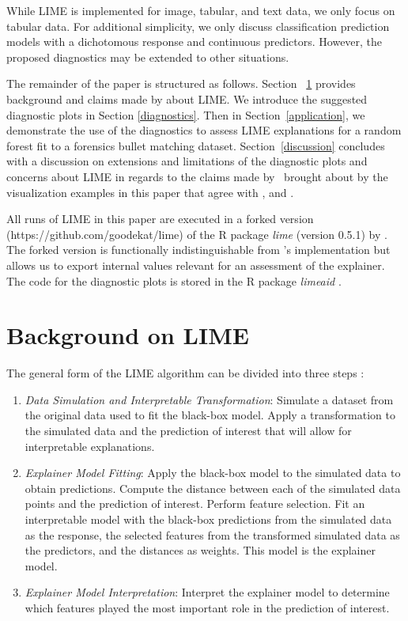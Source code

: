 \documentclass[AMS,STIX2COL]{WileyNJD-v2}\usepackage[]{graphicx}\usepackage[]{color}
\begin{document}
While LIME is implemented for image, tabular, and text data, we only focus on tabular data. For additional simplicity, we only discuss classification prediction models with a dichotomous response  and continuous predictors. However, the proposed diagnostics may be extended to other situations.

The remainder of the paper is structured as follows. Section ~\ref{background} provides background and claims made by \citet{ribeiro:2016} about LIME. We introduce the suggested diagnostic plots in Section \ref{diagnostics}. Then in Section~\ref{application}, we demonstrate the use of the diagnostics to assess LIME explanations for a random forest fit to a forensics bullet matching dataset. Section~\ref{discussion} concludes with a discussion on extensions and limitations of the diagnostic plots and concerns about LIME in regards to the claims made by~\citet{ribeiro:2016} brought about by the visualization examples in this paper that agree with \citet{alvarezmelis:2018, laugel:2018}, and \citet{molnar:2019}.

All runs of LIME in this paper are executed in a forked version (https://github.com/goodekat/lime) of the R package \emph{lime} (version 0.5.1) by \citet{pedersen:2020}. The forked version is functionally indistinguishable from \citeauthor{pedersen:2020}'s implementation but allows us to export internal values relevant for an assessment of the explainer. The code for the diagnostic plots is stored in the R package \emph{limeaid} \citep{goode:2020}.

\section{Background on LIME} \label{background}

The general form of the LIME algorithm can be divided into three steps \citep[see also][]{laugel:2018}:

\begin{enumerate}

\item \emph{Data Simulation and Interpretable Transformation}: Simulate a dataset from the original data used to fit the black-box model. Apply a transformation to the simulated data and the prediction of interest that will allow for interpretable explanations.

\item \emph{Explainer Model Fitting}: Apply the black-box model to the simulated data to obtain predictions. Compute the distance between each of the simulated data points and the prediction of interest. Perform feature selection. Fit an interpretable model with the black-box predictions from the simulated data as the response, the selected features from the transformed simulated data as the predictors, and the distances as weights. This model is the explainer model.

\item \emph{Explainer Model Interpretation}: Interpret the explainer model to determine which features played the most important role in the prediction of interest.

\end{enumerate}
\end{document}
